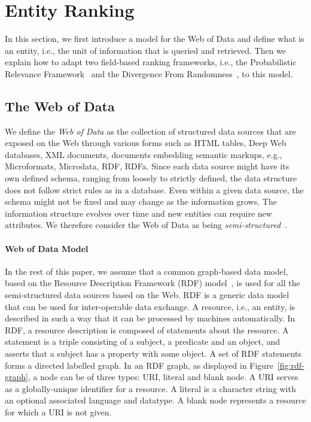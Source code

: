 \section{Entity Ranking}
\label{sec:ranking}

In this section, we first introduce a model for the Web of Data and define what is an entity, i.e., the unit of information that is queried and retrieved. Then we explain how to adapt two field-based ranking frameworks, i.e., the Probabilistic Relevance Framework~\cite{Robertson:2009:PRF} and the Divergence From Randomness~\cite{amati:2002:acm}, to this model.

\subsection{The Web of Data}
\label{sec:wod}

We define the \emph{Web of Data} as the collection of structured data sources that are exposed on the Web through various forms such as HTML tables, Deep Web databases, XML documents, documents embedding semantic markups, e.g., Microformats, Microdata, RDF, RDFa. Since each data source might have its own defined schema, ranging from loosely to strictly defined, the data structure does not follow strict rules as in a database. Even within a given data source, the schema might not be fixed and may change as the information grows. The information structure evolves over time and new entities can require new attributes. We therefore consider the Web of Data as being \emph{semi-structured}~\cite{abiteboul:1997:icdt}.

\paragraph{Web of Data Model} In the rest of this paper, we assume that a common graph-based data model, based on the Resource Description Framework (RDF) model~\cite{klyne_carroll:2004}, is used for all the semi-structured data sources based on the Web. RDF is a generic data model that can be used for inter-operable data exchange. A resource, i.e., an entity, is described in such a way that it can be processed by machines automatically. In RDF, a resource description is composed of statements about the resource. A statement is a triple consisting of a subject, a predicate and an object, and asserts that a subject has a property with some object. A set of RDF statements forms a directed labelled graph. In an RDF graph, as displayed in Figure~\ref{fig:rdf-graph}, a node can be of three types: URI, literal and blank node. A URI serves as a globally-unique identifier for a resource. A literal is a character string with an optional associated language and datatype. A blank node represents a resource for which a URI is not given.

